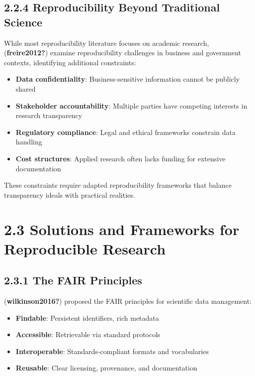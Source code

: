 \documentclass[
  oneside,
  open=any]{scrbook}
\providecommand{\tightlist}{%
  \setlength{\itemsep}{0pt}\setlength{\parskip}{0pt}}\usepackage{longtable,booktabs,array}
\begin{document}
\subsection{2.2.4 Reproducibility Beyond Traditional
Science}\label{reproducibility-beyond-traditional-science}

While most reproducibility literature focuses on academic research,
(\textbf{freire2012?}) examine reproducibility challenges in business
and government contexts, identifying additional constraints:

\begin{itemize}
\tightlist
\item
  \textbf{Data confidentiality}: Business-sensitive information cannot
  be publicly shared
\item
  \textbf{Stakeholder accountability}: Multiple parties have competing
  interests in research transparency
\item
  \textbf{Regulatory compliance}: Legal and ethical frameworks constrain
  data handling
\item
  \textbf{Cost structures}: Applied research often lacks funding for
  extensive documentation
\end{itemize}

These constraints require adapted reproducibility frameworks that
balance transparency ideals with practical realities.

\section{2.3 Solutions and Frameworks for Reproducible
Research}\label{solutions-and-frameworks-for-reproducible-research}

\subsection{2.3.1 The FAIR Principles}\label{the-fair-principles}

(\textbf{wilkinson2016?}) proposed the FAIR principles for scientific
data management:

\begin{itemize}
\tightlist
\item
  \textbf{Findable}: Persistent identifiers, rich metadata
\item
  \textbf{Accessible}: Retrievable via standard protocols
\item
  \textbf{Interoperable}: Standards-compliant formats and vocabularies
\item
  \textbf{Reusable}: Clear licensing, provenance, and documentation
\end{itemize}
\end{document}
